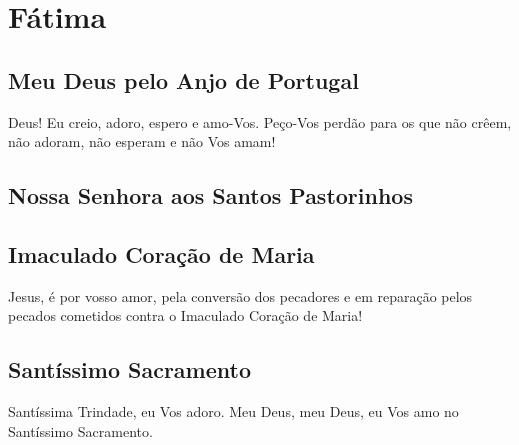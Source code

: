 \section{Fátima}

\subsection{Meu Deus pelo Anjo de Portugal}
 Deus! Eu creio, adoro, espero e amo-Vos. Peço-Vos perdão para os que não crêem, não adoram, não esperam e não Vos amam!


\subsection{Nossa Senhora aos Santos Pastorinhos}\label{omeujesus}


\subsection{Imaculado Coração de Maria}
 Jesus, é por vosso amor, pela conversão dos pecadores e em reparação pelos pecados cometidos contra o Imaculado Coração de Maria!

\subsection{Santíssimo Sacramento}
 Santíssima Trindade, eu Vos adoro. Meu Deus, meu Deus, eu Vos amo no Santíssimo Sacramento.

